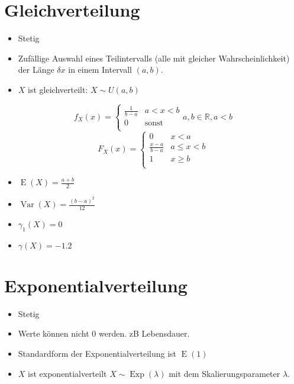\documentclass[a4paper,twocolumn]{article}
\DeclareMathOperator{\Var}{Var}
\DeclareMathOperator{\E}{E}
\DeclareMathOperator{\Exp}{Exp}
\begin{document}
\section{Gleichverteilung}

\begin{itemize}
  \item Stetig
  \item Zufällige Auswahl eines Teilintervalls (alle mit gleicher
        Wahrscheinlichkeit) der Länge $\delta x$ in einem Intervall $(a,b)$.
  \item $X$ ist gleichverteilt: $X \sim U(a,b)$
\end{itemize}

\[
    f_X(x) = \left\{\begin{array}{ll}
        \frac1{b-a} & a < x < b \\
        0           & \text{sonst} \\
    \end{array}\right.
    a,b \in \mathbb{R}, a < b
\] \[
    F_X(x) = \left\{\begin{array}{ll}
        0 & x < a \\
        \frac{x-a}{b-a} & a \leq x < b \\
        1 & x \geq b \\
    \end{array}\right.
\]

\begin{itemize}
  \item $\E(X) = \frac{a+b}{2}$
  \item $\Var(X) = \frac{(b-a)^2}{12}$
  \item $\gamma_1(X) = 0$
  \item $\gamma(X) = -1.2$
\end{itemize}

\section{Exponentialverteilung}

\begin{itemize}
  \item Stetig
  \item Werte können nicht $0$ werden. zB Lebensdauer.
  \item Standardform der Exponentialverteilung ist $\E(1)$
  \item $X$ ist exponentialverteilt $X\sim\Exp(\lambda)$
        mit dem Skalierungsparameter $\lambda$.
\end{itemize}
\end{document}

